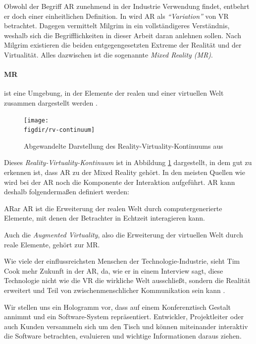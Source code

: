 Obwohl der Begriff AR zunehmend in der Industrie Verwendung findet, entbehrt er doch einer einheitlichen Definition. In \cite{azuma1997survey} wird AR als \emph{"`Variation"'} von VR betrachtet. Dagegen vermittelt Milgrim in \cite{milgram1995augmented} ein vollständigeres Verständnis, weshalb sich die Begrifflichkeiten in dieser Arbeit daran anlehnen sollen. Nach Milgrim existieren die beiden entgegengesetzten Extreme der Realität und der Virtualität. Alles dazwischen ist die sogenannte \emph{Mixed Reality (MR)}.

\paragraph{MR} ist eine Umgebung, in der Elemente der realen und einer virtuellen Welt zusammen dargestellt werden \cite{kato1999marker}.\\

\begin{figure}[htb]
  \texttt{[image: \\figdir/rv-continuum]}
  \caption{Abgewandelte Darstellung des Reality-Virtuality-Kontinuums aus \cite{milgram1995augmented}}
  \label{fig:rv-continuum}
\end{figure}

Dieses \emph{Reality-Virtuality-Kontinuum} ist in Abbildung \ref{fig:rv-continuum} dargestellt, in dem gut zu erkennen ist, dass AR zu der Mixed Reality gehört. In den meisten Quellen wie \cite{azuma1997survey, azuma2001recent, kato1999marker} wird bei der AR noch die Komponente der Interaktion aufgeführt. AR kann deshalb folgendermaßen definiert werden:

\begin{defbox}{AR}{ar}
   AR ist die Erweiterung der realen Welt durch computergenerierte Elemente, mit denen der Betrachter in Echtzeit interagieren kann.
\end{defbox}

Auch die \emph{Augmented Virtuality}, also die Erweiterung der virtuellen Welt durch reale Elemente, gehört zur MR.

Wie viele der einflussreichsten Menschen der Technologie-Industrie, sieht Tim Cook  mehr Zukunft in der AR, da, wie er in einem Interview sagt, diese Technologie nicht wie die VR die wirkliche Welt ausschließt, sondern die Realität erweitert und Teil von zwischenmenschlicher Kommunikation sein kann \cite{theindependent2017apple}.

Wir stellen uns ein Hologramm vor, dass auf einem Konferenztisch Gestalt annimmt und ein Software-System repräsentiert. Entwickler, Projektleiter oder auch Kunden versammeln sich um den Tisch und können miteinander interaktiv die Software betrachten, evaluieren und wichtige Informationen daraus ziehen.

